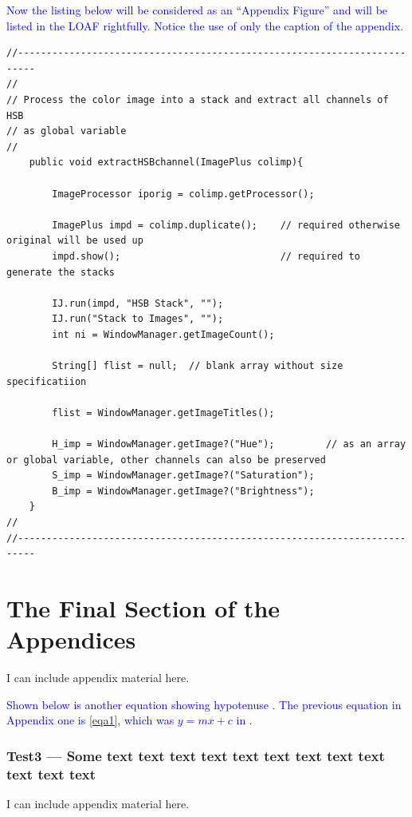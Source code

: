 \documentclass[phd,showframe]{ndsu-thesis-2022}
\newcommand\italk[1]{\textcolor{blue}{#1}}  %
\begin{document}
\italk{Now the listing below will be considered as an ``Appendix Figure'' and will be listed in the LOAF rightfully. Notice the use of only the caption of the appendix.}

{\singlespacing
\begin{lstlisting}
//-------------------------------------------------------------------------
//
// Process the color image into a stack and extract all channels of HSB 
// as global variable
//
	public void extractHSBchannel(ImagePlus colimp){

		ImageProcessor iporig = colimp.getProcessor();
		
		ImagePlus impd = colimp.duplicate();	// required otherwise original will be used up
		impd.show();						    // required to generate the stacks
		
		IJ.run(impd, "HSB Stack", "");
		IJ.run("Stack to Images", "");
		int ni = WindowManager.getImageCount();

		String[] flist = null;  // blank array without size specificatiion

		flist = WindowManager.getImageTitles();
		
		H_imp = WindowManager.getImage?("Hue");			// as an array or global variable, other channels can also be preserved
		S_imp = WindowManager.getImage?("Saturation");
		B_imp = WindowManager.getImage?("Brightness");
	}	
//
//-------------------------------------------------------------------------	
\end{lstlisting}
}


\newpage
\section{The Final Section of the Appendices}
I can include appendix material here. 

\italk{Shown below is another equation showing hypotenuse \Cref{eqc1}. The previous equation in Appendix one is \cref{eqa1}, which was $y = mx + c$ in \cpageref{eqa1}. } 
 

\subsubsection{Test3 --- Some text text text text text text text text text text text text}
I can include appendix material here. 
\end{document}
